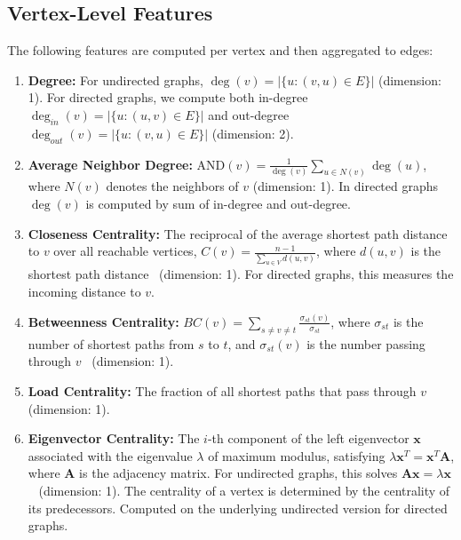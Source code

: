 \documentclass{article}
\begin{document}
    \subsection*{Vertex-Level Features}

    The following features are computed per vertex and then aggregated to edges:

    \begin{enumerate}
        \item \textbf{Degree:} For undirected graphs, $\deg(v) = |\{u : (v, u) \in E\}|$ (dimension: 1). For directed graphs, we compute both in-degree $\deg_{in}(v) = |\{u : (u, v) \in E\}|$ and out-degree $\deg_{out}(v) = |\{u : (v, u) \in E\}|$ (dimension: 2).

        \item \textbf{Average Neighbor Degree:} $\text{AND}(v) = \frac{1}{\deg(v)}\sum_{u\in N(v)}\deg(u)$, where $N( v)$ denotes the neighbors of $v$ (dimension: 1). In directed graphs $\deg (v)$ is computed by sum of in-degree and out-degree.

        \item \textbf{Closeness Centrality:} The reciprocal of the average shortest path distance to $v$ over all reachable vertices, $C(v) = \frac{n-1}{\sum_{u\in V}d(u,v)}$, where $d(u, v)$ is the shortest path distance~\citep{freeman1978centrality} (dimension: 1). For directed graphs, this measures the incoming distance to $v$.

        \item \textbf{Betweenness Centrality:} $BC(v) = \sum_{s\neq v\neq t}\frac{\sigma_{st}(v)}{\sigma_{st}}$, where $\sigma_{st}$ is the number of shortest paths from $s$ to $t$, and $\sigma_{st}(v)$ is the number passing through $v$~\citep{freeman1977set} (dimension: 1).

        \item \textbf{Load Centrality:} The fraction of all shortest paths that pass through $v$~\citep{newman2001scientific} (dimension: 1).

        \item \textbf{Eigenvector Centrality:} The $i$-th component of the left eigenvector $\mathbf{x}$ associated with the eigenvalue $\lambda$ of maximum modulus, satisfying $\lambda\mathbf{x}^{T}= \mathbf{x}^{T}\mathbf{A}$, where $\mathbf{A}$ is the adjacency matrix. For undirected graphs, this solves $\mathbf{A}\mathbf{x}= \lambda\mathbf{x}$~\citep{bonacich1972technique} (dimension: 1). The centrality of a vertex is determined by the centrality of its predecessors. Computed on the underlying undirected version for directed graphs.


\end{enumerate}
\end{document}
